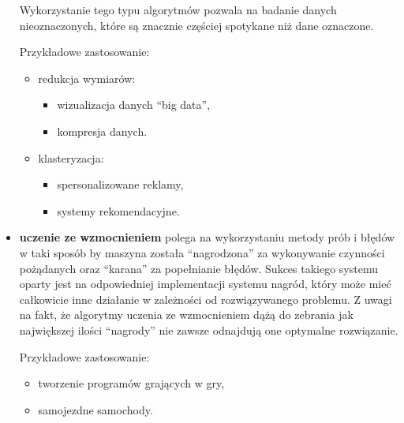 \begin{itemize}
\begin{itemize}
    \end{itemize} 
    Wykorzystanie tego typu algorytmów pozwala na badanie danych nieoznaczonych,
    które są znacznie częściej spotykane niż dane oznaczone.
    
    Przykładowe zastosowanie:
    \begin{itemize}
        \item redukcja wymiarów:
        \begin{itemize}
            \item wizualizacja danych ``big data'',
            \item kompresja danych.
        \end{itemize}
        \item klasteryzacja:
        \begin{itemize}
            \item spersonalizowane reklamy,
            \item systemy rekomendacyjne.
        \end{itemize}
    \end{itemize}
    \item \textbf{uczenie ze wzmocnieniem}
    polega na wykorzystaniu metody prób i błędów w taki sposób by maszyna została
    ``nagrodzona'' za wykonywanie czynności pożądanych oraz ``karana'' za popełnianie błędów. 
    Sukces takiego systemu oparty jest na odpowiedniej implementacji systemu nagród, który może 
    mieć całkowicie inne działanie w zależności od rozwiązywanego problemu. 
    Z uwagi na fakt, że algorytmy uczenia ze wzmocnieniem dążą do zebrania jak największej
    ilości ``nagrody'' nie zawsze odnajdują one optymalne rozwiązanie.
    
    Przykładowe zastosowanie:
    \begin{itemize}
        \item tworzenie programów grających w gry,
        \item samojezdne samochody.
    \end{itemize}
\end{itemize} 

